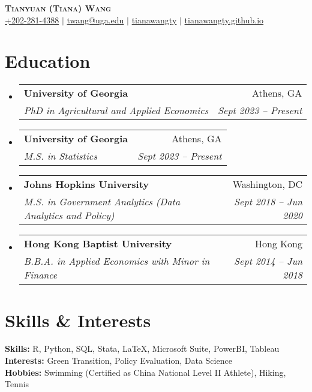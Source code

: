 \documentclass[letterpaper,11pt]{article}
\makeatletter
\newcommand{\resumeSubheading}[4]{
  \vspace{-2pt}\item
    \begin{tabular*}{0.97\textwidth}[t]{l@{\extracolsep{\fill}}r}
      \textbf{#1} & #2 \\
      \textit{\small#3} & \textit{\small #4} \\
    \end{tabular*}\vspace{-7pt}
}
\newcommand{\resumeSubHeadingListStart}{\begin{itemize}[leftmargin=0.15in, label={}]}
\newcommand{\resumeSubHeadingListEnd}{\end{itemize}}
\makeatother
\begin{document}
\begin{center}
    \textbf{\huge \scshape Tianyuan (Tiana) Wang} \\
    \vspace{3pt}
    \small
    \faMobile \hspace{.5pt} \href{tel:2022814388}{+202-281-4388}
    $|$
    \faEnvelopeO \hspace{.5pt} \href{twang@uga.edu}{twang@uga.edu}
    $|$
    \faLinkedinSquare \hspace{.5pt} \href{https://www.linkedin.com/in/tianawangty}{tianawangty}
    $|$
    \faGithub \hspace{.5pt} \href{https://tianawangty.github.io}{tianawangty.github.io}
\end{center}


\section{Education}
  \resumeSubHeadingListStart
    \resumeSubheading
      {University of Georgia}{Athens, GA}
      {PhD in Agricultural and Applied Economics}{Sept 2023 -- Present}
    \resumeSubheading
      {University of Georgia}{Athens, GA}
      {M.S. in Statistics}{Sept 2023 -- Present}
    \resumeSubheading
      {Johns Hopkins University}{Washington, DC}
      {M.S. in Government Analytics (Data Analytics and Policy)}{Sept 2018 -- Jun 2020}
    \resumeSubheading
      {Hong Kong Baptist University}{Hong Kong}
      {B.B.A. in Applied Economics with Minor in Finance}{Sept 2014 -- Jun 2018}
  \resumeSubHeadingListEnd


\section{Skills \& Interests}
 \begin{itemize}[leftmargin=0.15in, label={}]
    \small{\item{
    \vspace{1mm}
     \textbf{Skills: }{R, Python, SQL, Stata, \LaTeX, Microsoft Suite, PowerBI, Tableau} \\
     \vspace{1mm}
     \textbf{Interests: }{Green Transition, Policy Evaluation, Data Science} \\
     \vspace{1mm}
     \textbf{Hobbies: }{Swimming (Certified as China National Level II Athlete), Hiking, Tennis} \\
     \vspace{1mm}
    }}
 \end{itemize}
\end{document}
